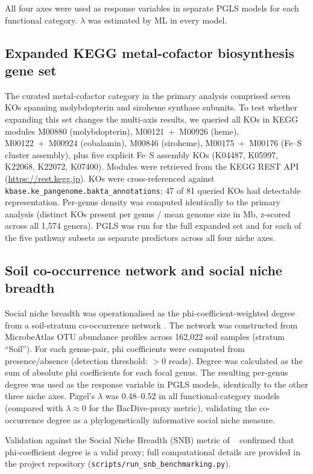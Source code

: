 \documentclass[times]{zHenriquesLab-StyleBioRxiv}
\begin{document}
All four axes were used as response variables in separate PGLS models for each
functional category. $\lambda$ was estimated by ML in every model.

\subsection{Expanded KEGG metal-cofactor biosynthesis gene set}

The curated metal-cofactor category in the primary analysis comprised seven KOs
spanning molybdopterin and siroheme synthase subunits. To test whether expanding
this set changes the multi-axis results, we queried all KOs in KEGG modules
M00880 (molybdopterin), M00121~+~M00926 (heme), M00122~+~M00924 (cobalamin),
M00846 (siroheme), M00175~+~M00176 (Fe--S cluster assembly), plus five explicit
Fe--S assembly KOs (K04487, K05997, K22068, K22072, K07400). Modules were
retrieved from the KEGG REST API (\url{https://rest.kegg.jp}). KOs were
cross-referenced against \texttt{kbase.ke\_pangenome.bakta\_annotations}; 47
of 81 queried KOs had detectable representation. Per-genus density was
computed identically to the primary analysis (distinct KOs present per genus /
mean genome size in Mb, z-scored across all 1,574 genera). PGLS was run for the
full expanded set and for each of the five pathway subsets as separate predictors
across all four niche axes.

\subsection{Soil co-occurrence network and social niche breadth}

Social niche breadth was operationalised as the phi-coefficient-weighted degree
from a soil-stratum co-occurrence network \cite{veech2013}. The network was
constructed from MicrobeAtlas OTU abundance profiles across 162,022 soil samples
(stratum ``Soil''). For each genus-pair, phi coefficients were computed from
presence/absence (detection threshold: $> 0$ reads). Degree was calculated as the
sum of absolute phi coefficients for each focal genus. The resulting per-genus
degree was used as the response variable in PGLS models, identically to the other
three niche axes. Pagel's $\lambda$ was 0.48--0.52 in all functional-category
models (compared with $\lambda \approx 0$ for the BacDive-proxy metric), validating
the co-occurrence degree as a phylogenetically informative social niche measure.

Validation against the Social Niche Breadth (SNB) metric of
\citeauthor{vonmeijenfeldt2023}~\cite{vonmeijenfeldt2023} confirmed that
phi-coefficient degree is a valid proxy; full computational details are
provided in the project repository
(\texttt{scripts/run\_snb\_benchmarking.py}).
\end{document}
